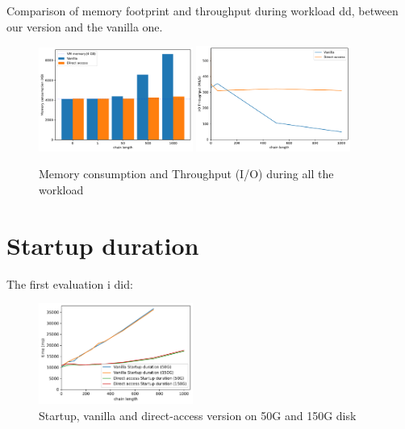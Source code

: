 \documentclass[sigplan,screen,10pt]{acmart}
\begin{document}
	Comparison of memory footprint and throughput during workload dd, between our version and the vanilla one.
	
	\begin{figure}[h]
		\center
		\includegraphics[width=0.45\textwidth]{memory_consumption.pdf}
		\includegraphics[width=0.45\textwidth]{workload_dd_throughput.pdf}
		\caption{Memory consumption and Throughput (I/O) during all the workload}
		\label{fig:fig3}
	\end{figure}
	
	\section*{Startup duration}
	
	The first evaluation i did:
	
	\begin{figure}[h]
		\center
		\includegraphics[width=0.45\textwidth]{startup_duration.pdf}
		\caption{Startup, vanilla and direct-access version on 50G and 150G disk}
		\label{fig:fig34}
	\end{figure}
\end{document}
